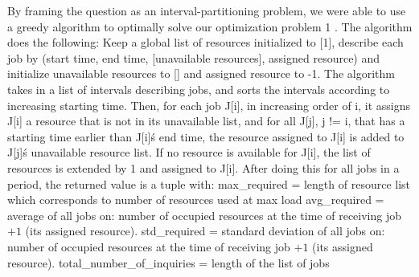 \documentclass[journal, a4paper]{IEEEtran}
\begin{document}
\tab By framing the question as an interval-partitioning problem, we were able to use a
greedy algorithm to optimally solve our optimization problem 1 . The algorithm does
the following:
Keep a global list of resources initialized to [1], describe each job by (start time, end
time, [unavailable resources], assigned resource) and initialize unavailable
resources to [] and assigned resource to -1. The algorithm takes in a list of intervals
describing jobs, and sorts the intervals according to increasing starting time. Then,
for each job J[i], in increasing order of i, it assigns J[i] a resource that is not in its
unavailable list, and for all J[j], j != i, that has a starting time earlier than J[i]\'s end
time, the resource assigned to J[i] is added to J[j]\'s unavailable resource list. If no
resource is available for J[i], the list of resources is extended by 1 and assigned to
J[i]. After doing this for all jobs in a period, the returned value is a tuple with:
\newline
\newline
max\_required = length of resource list which corresponds to number of resources
used at max load
\newline
\newline
avg\_required = average of all jobs on: number of occupied resources at the time of
receiving job $+ 1$ (its assigned resource).
\newline
\newline
std\_required = standard deviation of all jobs on: number of occupied resources at the
time of receiving job $+ 1$ (its assigned resource).
\newline 
\newline
total\_number\_of\_inquiries = length of the list of jobs
\newline
\end{document}
